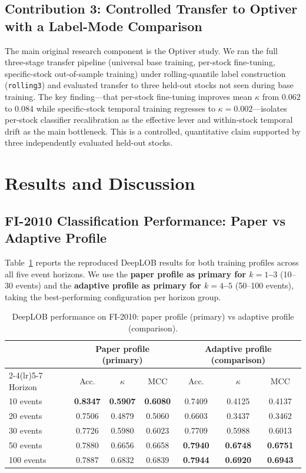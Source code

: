 \documentclass[11pt]{article}
\begin{document}
\subsection{Contribution 3: Controlled Transfer to Optiver with a Label-Mode Comparison}
The main original research component is the Optiver study. We ran the full three-stage transfer pipeline (universal base training, per-stock fine-tuning, specific-stock out-of-sample training) under rolling-quantile label construction (\texttt{rolling3}) and evaluated transfer to three held-out stocks not seen during base training. The key finding---that per-stock fine-tuning improves mean $\kappa$ from $0.062$ to $0.084$ while specific-stock temporal training regresses to $\kappa{=}0.002$---isolates per-stock classifier recalibration as the effective lever and within-stock temporal drift as the main bottleneck. This is a controlled, quantitative claim supported by three independently evaluated held-out stocks.

\section{Results and Discussion}
\subsection{FI-2010 Classification Performance: Paper vs Adaptive Profile}
Table~\ref{tab:fi-main} reports the reproduced DeepLOB results for both training profiles across all five event horizons. We use the \textbf{paper profile as primary for $k{=}1$--$3$} (10--30 events) and the \textbf{adaptive profile as primary for $k{=}4$--$5$} (50--100 events), taking the best-performing configuration per horizon group.

\begin{table}[H]
\centering
\caption{DeepLOB performance on FI-2010: paper profile (primary) vs adaptive profile (comparison).}
\label{tab:fi-main}
\begin{tabular}{lcccccc}
\toprule
 & \multicolumn{3}{c}{\textbf{Paper profile (primary)}} & \multicolumn{3}{c}{\textbf{Adaptive profile (comparison)}} \\
\cmidrule(lr){2-4}\cmidrule(lr){5-7}
Horizon & Acc. & $\kappa$ & MCC & Acc. & $\kappa$ & MCC \\
\midrule
10 events & \textbf{0.8347} & \textbf{0.5907} & \textbf{0.6080} & 0.7409 & 0.4125 & 0.4137 \\
20 events & 0.7506 & 0.4879 & 0.5060 & 0.6603 & 0.3437 & 0.3462 \\
30 events & 0.7726 & 0.5980 & 0.6023 & 0.7709 & 0.5988 & 0.6013 \\
50 events & 0.7880 & 0.6656 & 0.6658 & \textbf{0.7940} & \textbf{0.6748} & \textbf{0.6751} \\
100 events & 0.7887 & 0.6832 & 0.6839 & \textbf{0.7944} & \textbf{0.6920} & \textbf{0.6943} \\
\bottomrule
\end{tabular}
\end{table}
\end{document}
